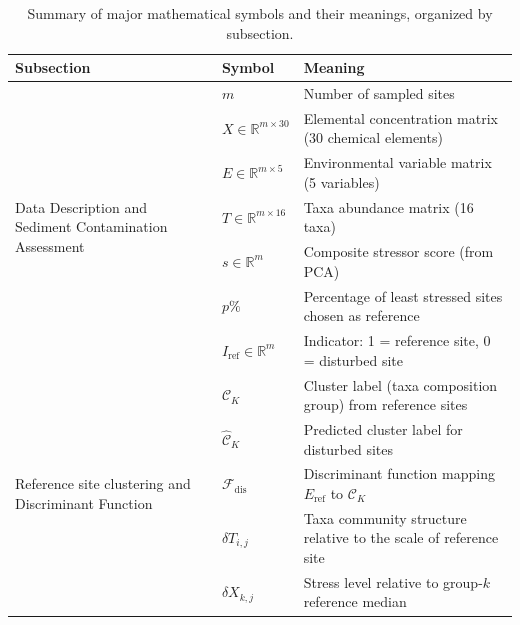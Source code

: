 \begin{table}[!h]
\centering
\caption{Summary of major mathematical symbols and their meanings, organized by subsection.}
\begin{tabular}{lll}
\toprule
\textbf{Subsection} & \textbf{Symbol} & \textbf{Meaning} \\
\midrule
\multirow{7}{*}{\parbox{3cm}{\centering Data Description and Sediment Contamination Assessment}} 
& $m$ & Number of sampled sites \\
& $X \in \mathbb{R}^{m \times 30}$ & Elemental concentration matrix (30 chemical elements) \\
& $E \in \mathbb{R}^{m \times 5}$ & Environmental variable matrix (5 variables) \\
& $T \in \mathbb{R}^{m \times 16}$ & Taxa abundance matrix (16 taxa) \\
& $s \in \mathbb{R}^m$ & Composite stressor score (from PCA) \\
& $p\%$ & Percentage of least stressed sites chosen as reference \\
& $I_{\mathrm{ref}} \in \mathbb{R}^m$ & Indicator: 1 = reference site, 0 = disturbed site \\
\midrule

\multirow{5}{*}{\parbox{3cm}{\centering Reference site clustering and Discriminant Function}} 
& $\mathcal{C}_K$ & Cluster label (taxa composition group) from reference sites \\
& $\hat{\mathcal{C}}_K$ & Predicted cluster label for disturbed sites \\
& $\mathcal{F}_{\mathrm{dis}}$ & Discriminant function mapping $E_{\mathrm{ref}}$ to $\mathcal{C}_K$ \\
& $\delta T_{i,j}$ & Taxa community structure relative to the scale of reference site \\
& $\delta X_{k,j}$ & Stress level relative to group-$k$ reference median \\
\midrule


\end{tabular}
\end{table}
